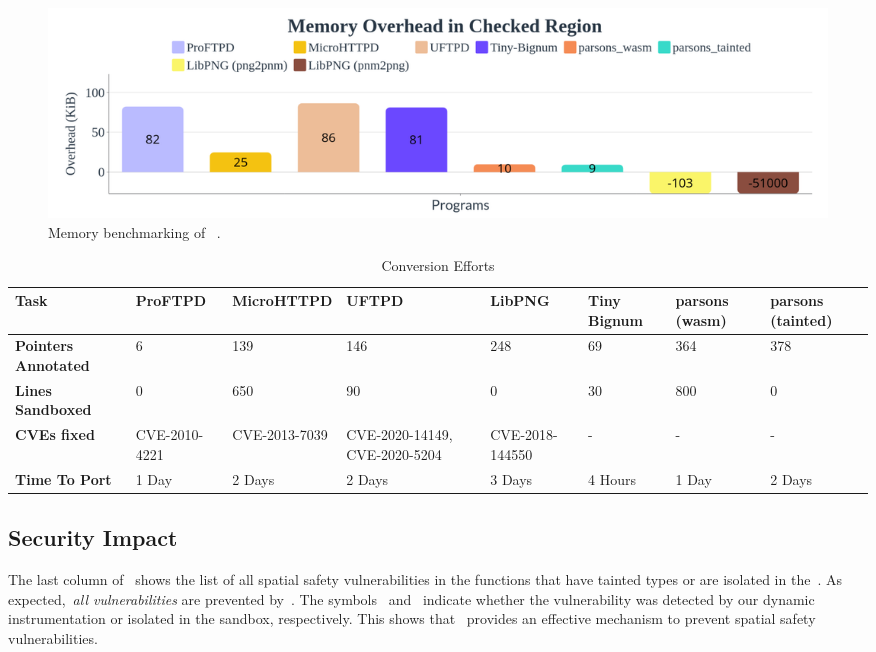 \begin{figure}[t]
\includegraphics[width=1.0\linewidth]{images/program_memory_benchmark.png}
\caption{Memory benchmarking of ~\systemname.}
\label{fig:memory}
\end{figure}


\begin{table}[htb]
  \centering
  \begin{tabular}{|p{2.6 cm }|p{1.6 cm}|p{1.9cm}|p{1.7cm}|p{2cm}|p{1.5cm}|p{1.5cm}|p{1.5cm}|}
    \hline
    \textbf{Task} & \textbf{ProFTPD} & \textbf{MicroHTTPD} & \textbf{UFTPD} & \textbf{LibPNG} & \textbf{Tiny Bignum} & \textbf{parsons (wasm)} & \textbf{parsons (tainted) }\\
    \hline
     \textbf{Pointers Annotated} & 6 & 139 & 146 & 248 & 69 & 364 & 378 \\
     \textbf{Lines Sandboxed} & 0 & 650 & 90 & 0 & 30 & 800 & 0  \\
     \textbf{CVEs fixed} & CVE-2010-4221 & CVE-2013-7039 & CVE-2020-14149, CVE-2020-5204 & CVE-2018-144550 & - & - & -  \\
     \textbf{Time To Port} & 1 Day & 2 Days & 2 Days & 3 Days & 4 Hours & 1 Day & 2 Days \\
    \hline
  \end{tabular}
  \caption{Conversion Efforts}
\end{table}


\subsection{Security Impact}
\label{subsec:securityimpact}
The last column of~ shows the list of all spatial safety vulnerabilities in the functions that have tainted types or are isolated in the~\ucregion{}.
As expected,~\emph{all vulnerabilities} are prevented by~\systemname{}.
The symbols~\vulprevented{} and~\vulisolated{} indicate whether the vulnerability was detected by our dynamic instrumentation or isolated in the sandbox, respectively.
This shows that~\systemname{} provides an effective mechanism to prevent spatial safety vulnerabilities.

